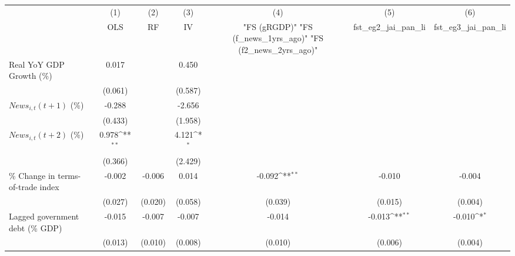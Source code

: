 {
\def\sym#1{\ifmmode^{#1}\else\(^{#1}\)\fi}
\begin{tabular}{l*{6}{c}}
\toprule
                    &\multicolumn{1}{c}{(1)}&\multicolumn{1}{c}{(2)}&\multicolumn{1}{c}{(3)}&\multicolumn{1}{c}{(4)}&\multicolumn{1}{c}{(5)}&\multicolumn{1}{c}{(6)}\\
                    &\multicolumn{1}{c}{OLS}&\multicolumn{1}{c}{RF}&\multicolumn{1}{c}{IV}&\multicolumn{1}{c}{ "FS (gRGDP)"  "FS (f_news_1yrs_ago)"  "FS (f2_news_2yrs_ago)" }&\multicolumn{1}{c}{fst_eg2_jai_pan_li}&\multicolumn{1}{c}{fst_eg3_jai_pan_li}\\
\midrule
Real YoY GDP Growth (\%)&       0.017         &                     &       0.450         &                     &                     &                     \\
                    &     (0.061)         &                     &     (0.587)         &                     &                     &                     \\
\addlinespace
$ News_{i,t}(t+1)$ (\%)&      -0.288         &                     &      -2.656         &                     &                     &                     \\
                    &     (0.433)         &                     &     (1.958)         &                     &                     &                     \\
\addlinespace
$ News_{i,t}(t+2)$ (\%)&       0.978\sym{**} &                     &       4.121\sym{*}  &                     &                     &                     \\
                    &     (0.366)         &                     &     (2.429)         &                     &                     &                     \\
\addlinespace
\% Change in terms-of-trade index&      -0.002         &      -0.006         &       0.014         &      -0.092\sym{**} &      -0.010         &      -0.004         \\
                    &     (0.027)         &     (0.020)         &     (0.058)         &     (0.039)         &     (0.015)         &     (0.004)         \\
\addlinespace
Lagged government debt (\% GDP)&      -0.015         &      -0.007         &      -0.007         &      -0.014         &      -0.013\sym{**} &      -0.010\sym{*}  \\
                    &     (0.013)         &     (0.010)         &     (0.008)         &     (0.010)         &     (0.006)         &     (0.004)         \\

\end{tabular}}

